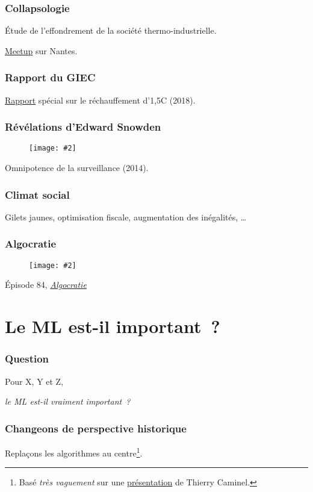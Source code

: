 \documentclass[10pt]{beamer}
\newcommand{\imgtw}[2][1]{%
  \begin{figure}%
    \centering%
    \texttt{[image: \#2]}%
  \end{figure}%
}
\newcommand{\imgth}[2][1]{%
  \begin{figure}%
    \centering%
    \texttt{[image: \#2]}%
  \end{figure}%
}
\begin{document}
\begin{frame}
  \frametitle{Collapsologie}

  Étude de l'effondrement de la société thermo-industrielle.

  \href{https://www.meetup.com/Collapsologie-Nantes/}{Meetup} sur
  Nantes.
\end{frame}


\begin{frame}
  \frametitle{Rapport du GIEC}

  \href{https://www.ipcc.ch/sr15/}{Rapport} spécial sur le
  réchauffement d'1,5\degres C (2018).
\end{frame}

\begin{frame}
  \frametitle{Révélations d'Edward Snowden}
  \imgth[.7]{edward}
  Omnipotence de la surveillance (2014).
\end{frame}

\begin{frame}
  \frametitle{Climat social}

  Gilets jaunes, optimisation fiscale, augmentation des inégalités, …
\end{frame}

\begin{frame}
  \frametitle{Algocratie}

  \imgtw[.5]{algocratie}

  Épisode 84, \href{https://youtu.be/oJHfUv9RIY0?t=524}{\emph{Algocratie}}
\end{frame}

\section{Le ML est-il important ?}
\label{sec:le-ml-est-il-important}

\begin{frame}
  \frametitle{Question}
  Pour X, Y et Z,

  \vspace{1cm}

  \centering
  \emph{le ML est-il \alert{vraiment} important ?}
\end{frame}

\begin{frame}
  \frametitle{Changeons de perspective historique}
  Replaçons les algorithmes au centre\footnote{Basé \emph{très
      vaguement} sur une
    \href{https://docs.google.com/presentation/d/1XqMVwzmQpQL7gxz-75GYchZ\_BdzBmk2r3-C3NDTHYvQ/edit\#slide=id.g41eb28881a\_0\_16}{présentation}
    de Thierry Caminel.}.
\end{frame}
\end{document}
